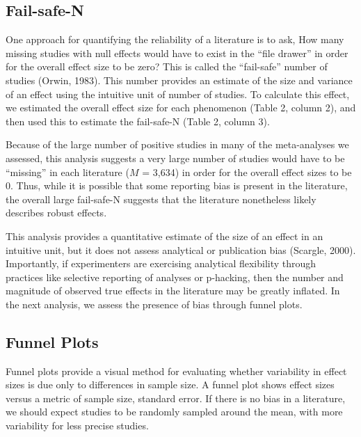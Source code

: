 \documentclass[9pt,twocolumn,twoside,lineno]{pnas-new}
\begin{document}
\subsection*{Fail-safe-N}\label{fail-safe-n}

One approach for quantifying the reliability of a literature is to ask,
How many missing studies with null effects would have to exist in the
\enquote{file drawer} in order for the overall effect size to be zero?
This is called the \enquote{fail-safe} number of studies (Orwin, 1983).
This number provides an estimate of the size and variance of an effect
using the intuitive unit of number of studies. To calculate this effect,
we estimated the overall effect size for each phenomenon (Table 2,
column 2), and then used this to estimate the fail-safe-N (Table 2,
column 3).

Because of the large number of positive studies in many of the
meta-analyses we assessed, this analysis suggests a very large number of
studies would have to be \enquote{missing} in each literature (\(M\) =
3,634) in order for the overall effect sizes to be 0. Thus, while it is
possible that some reporting bias is present in the literature, the
overall large fail-safe-N suggests that the literature nonetheless
likely describes robust effects.

This analysis provides a quantitative estimate of the size of an effect
in an intuitive unit, but it does not assess analytical or publication
bias (Scargle, 2000). Importantly, if experimenters are exercising
analytical flexibility through practices like selective reporting of
analyses or p-hacking, then the number and magnitude of observed true
effects in the literature may be greatly inflated. In the next analysis,
we assess the presence of bias through funnel plots.






\subsection*{Funnel Plots}\label{funnel-plots}

Funnel plots provide a visual method for evaluating whether variability
in effect sizes is due only to differences in sample size. A funnel plot
shows effect sizes versus a metric of sample size, standard error. If
there is no bias in a literature, we should expect studies to be
randomly sampled around the mean, with more variability for less precise
studies.
\end{document}
